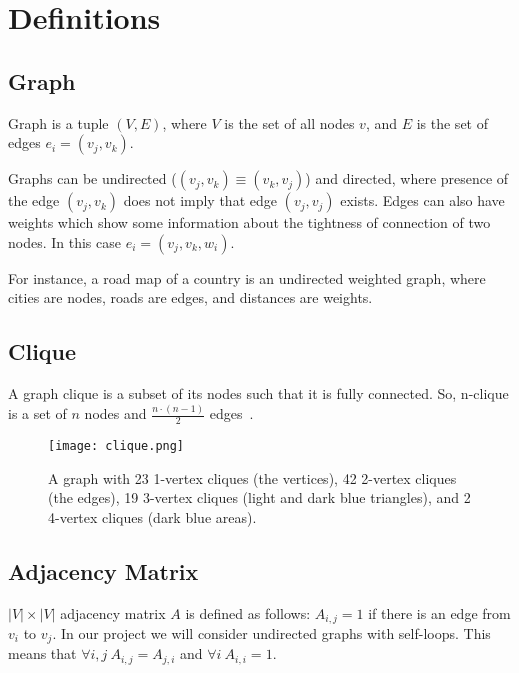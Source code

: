 \section{Definitions}

\subsection*{Graph}

    Graph is a tuple $\left( V, E \right)$, where $V$ is the set of all nodes $v$, and $E$ is the set of edges $e_i = (v_j, v_k)$.

    Graphs can be undirected ($(v_j, v_k) \equiv (v_k, v_j)$) and directed, where presence of the edge $(v_j, v_k)$ does not imply that edge $(v_j, v_j)$ exists.
    Edges can also have weights which show some information about the tightness of connection of two nodes.
    In this case $e_i = (v_j, v_k, w_i)$.

    For instance, a road map of a country is an undirected weighted graph, where cities are nodes, roads are edges, and distances are weights.


\subsection*{Clique}

    A graph clique is a subset of its nodes such that it is fully connected.
    So, n-clique is a set of $n$ nodes and $\frac{n \cdot (n - 1)}{2}$ edges~\cite{wiki_clique}.

    \begin{figure}[h]
        \centering
        \texttt{[image: clique.png]}
        \caption{A graph with 23 1-vertex cliques (the vertices), 42 2-vertex cliques (the edges), 19 3-vertex cliques (light and dark blue triangles), and 2 4-vertex cliques (dark blue areas).}
    \end{figure}


\subsection*{Adjacency Matrix}

    $\lvert V \rvert \times \lvert V \rvert$ adjacency matrix $A$ is defined as follows: $A_{i, j} = 1$ if there is an edge from $v_i$ to $v_j$.
    In our project we will consider undirected graphs with self-loops.
    This means that $\forall i, j\ A_{i, j} = A_{j, i}$ and $\forall i\ A_{i, i} = 1$.


